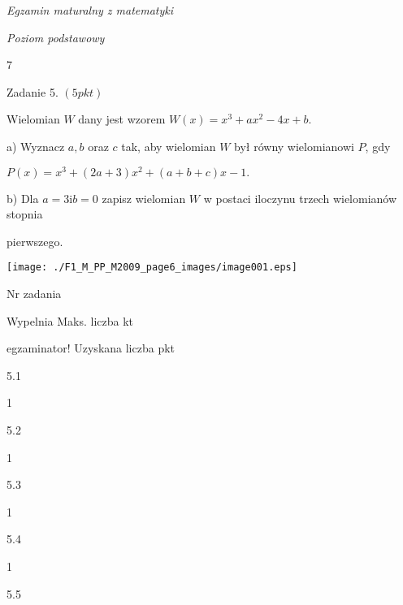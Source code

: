 \documentclass[a4paper,12pt]{article}
\begin{document}
{\it Egzamin maturalny z matematyki}

{\it Poziom podstawowy}

7

Zadanie 5. $(5pkt)$

Wielomian $W$ dany jest wzorem $W(x)=x^{3}+ax^{2}-4x+b.$

a) Wyznacz $a, b$ oraz $c$ tak, aby wielomian $W$ był równy wielomianowi $P$, gdy

$P(x)=x^{3}+(2a+3)x^{2}+(a+b+c)x-1.$

b) Dla $a=3 \mathrm{i} b=0$ zapisz wielomian $W$ w postaci iloczynu trzech wielomianów stopnia

pierwszego.
\begin{center}
\texttt{[image: ./F1\_M\_PP\_M2009\_page6\_images/image001.eps]}
\end{center}
Nr zadania

Wypelnia Maks. liczba kt

egzaminator! Uzyskana liczba pkt

5.1

1

5.2

1

5.3

1

5.4

1

5.5
\end{document}
